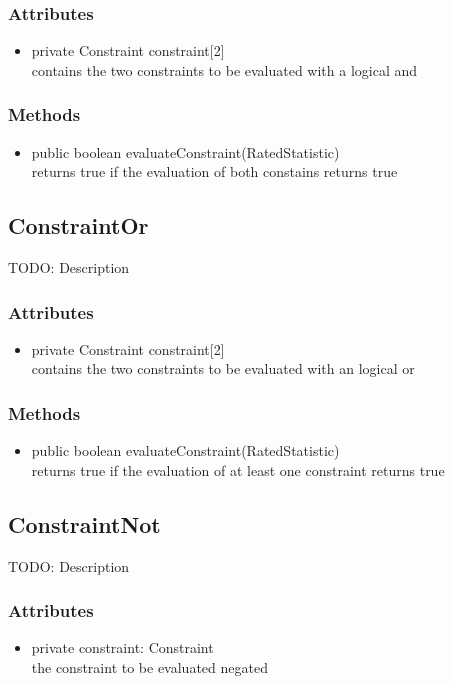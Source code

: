 \subsubsection{Attributes}
\begin{itemize}
	\item private  Constraint constraint[2]\\
	contains the two constraints to be evaluated with a logical and	
\end{itemize}
\subsubsection{Methods}
\begin{itemize}
	\item public boolean evaluateConstraint(RatedStatistic)\\
	returns true if the evaluation of both constains returns true
\end{itemize}


\subsection{ConstraintOr }
TODO: Description

\subsubsection{Attributes}
\begin{itemize}
	\item private Constraint constraint[2]\\
	contains the two constraints to be evaluated with an logical or
\end{itemize}
\subsubsection{Methods}
\begin{itemize}
	\item public boolean evaluateConstraint(RatedStatistic)\\
	returns true if the evaluation of at least one constraint returns true
\end{itemize}


\subsection{ConstraintNot }
TODO: Description

\subsubsection{Attributes}
\begin{itemize}
	\item private constraint: Constraint\\
	the constraint to be evaluated negated
\end{itemize}

